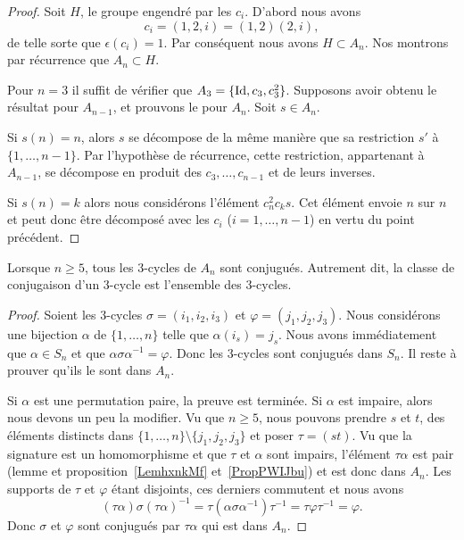 \begin{proof}
    Soit \( H\), le groupe engendré par les \( c_i\). D'abord nous avons
    \begin{equation}
        c_i=(1,2,i)=(1,2)(2,i),
    \end{equation}
    de telle sorte que \( \epsilon(c_i)=1\). Par conséquent nous avons \( H\subset A_n\). Nos montrons par récurrence que \( A_n\subset H\).

    Pour \( n=3\) il suffit de vérifier que \( A_3=\{ \operatorname{Id},c_3,c_3^2 \}\). Supposons avoir obtenu le résultat pour \(A_{n-1}\), et prouvons le pour \( A_n\). Soit \( s\in A_n\).

    Si \( s(n)=n\), alors \( s\) se décompose de la même manière que sa restriction \( s'\) à \( \{ 1,\ldots, n-1 \}\). Par l'hypothèse de récurrence, cette restriction, appartenant à \( A_{n-1}\),  se décompose en produit des \( c_3,\ldots, c_{n-1}\) et de leurs inverses.

    Si \( s(n)=k\) alors nous considérons l'élément \( c^2_nc_ks\). Cet élément envoie \( n\) sur \( n\) et peut donc être décomposé avec les \( c_i\) (\( i=1,\ldots, n-1\)) en vertu du point précédent.
\end{proof}

\begin{proposition} \label{PropiodtBG}
    Lorsque \( n\geq 5\), tous les \( 3\)-cycles de \( A_n\) sont conjugués. Autrement dit, la classe de conjugaison d'un \( 3\)-cycle est l'ensemble des \( 3\)-cycles.
\end{proposition}

\begin{proof}
    Soient les \( 3\)-cycles \( \sigma=(i_1,i_2,i_3)\) et \( \varphi=(j_1,j_2,j_3)\). Nous considérons une bijection \( \alpha\) de \( \{ 1,\ldots, n \}\) telle que \( \alpha(i_s)=j_s\). Nous avons immédiatement que \( \alpha\in S_n\) et que \( \alpha\sigma\alpha^{-1}=\varphi\). Donc les \( 3\)-cycles sont conjugués dans \( S_n\). Il reste à prouver qu'ils le sont dans \( A_n\).

    Si \( \alpha\) est une permutation paire, la preuve est terminée. Si \( \alpha\) est impaire, alors nous devons un peu la modifier. Vu que \( n\geq 5\), nous pouvons prendre \( s\) et \( t\), des éléments distincts dans \( \{ 1,\ldots, n \}\setminus\{ j_1,j_2,j_3 \}\) et poser \( \tau=(st)\). Vu que la signature est un homomorphisme et que \( \tau\) et \( \alpha\) sont impairs, l'élément \( \tau\alpha\) est pair (lemme et proposition~\ref{LemhxnkMf} et~\ref{PropPWIJbu}) et est donc dans \( A_n\). Les supports de \( \tau\) et \( \varphi\) étant disjoints, ces derniers commutent et nous avons
    \begin{equation}
        (\tau\alpha)\sigma(\tau\alpha)^{-1}=\tau(\alpha\sigma\alpha^{-1})\tau^{-1}=\tau\varphi\tau^{-1} = \varphi.
    \end{equation}
    Donc \( \sigma\) et \( \varphi\) sont conjugués par \( \tau\alpha\) qui est dans \( A_n\).
\end{proof}


